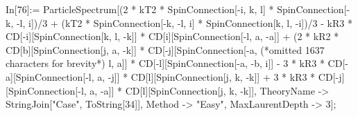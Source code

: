 In[76]:= ParticleSpectrum[(2 * kT2 * SpinConnection[-i, k, l] * SpinConnection[-k, -l, i])/3 + (kT2 * SpinConnection[-k, -l, i] * SpinConnection[k, l, -i])/3 - kR3 * CD[-i][SpinConnection[k, l, -k]] * CD[i][SpinConnection[-l, a, -a]] + (2 * kR2 * CD[b][SpinConnection[j, a, -k]] * CD[-j][SpinConnection[-a, (*omitted 1637 characters for brevity*) l, a]] * CD[-l][SpinConnection[-a, -b, i]] - 3 * kR3 * CD[-a][SpinConnection[-l, a, -j]] * CD[l][SpinConnection[j, k, -k]] + 3 * kR3 * CD[-j][SpinConnection[-l, a, -a]] * CD[l][SpinConnection[j, k, -k]], TheoryName -> StringJoin["Case", ToString[34]], Method -> "Easy", MaxLaurentDepth -> 3];